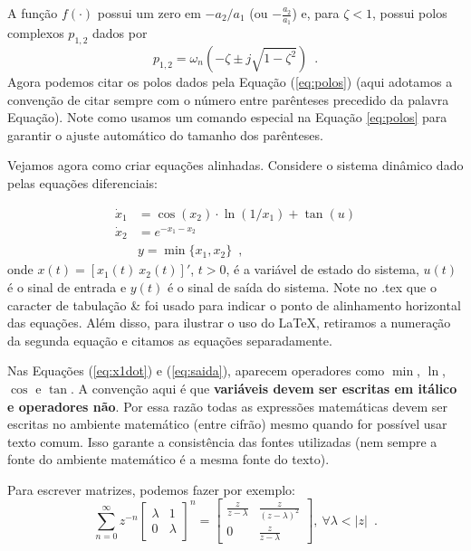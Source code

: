 A função $f(\cdot)$ possui um zero em $-a_2/a_1$ (ou $-\frac{a_2}{a_1}$) e, para $\zeta<1$, possui polos complexos $p_{1,2}$ dados por
\begin{equation}
\label{eq:polos}
p_{1,2}=\omega_n \left(-\zeta\pm j\sqrt{1-\zeta^2}\right)
\enspace.
\end{equation}
Agora podemos citar os polos dados pela Equação (\ref{eq:polos}) (aqui adotamos a convenção de citar sempre com o número entre parênteses precedido da palavra Equação). Note como usamos um comando especial na Equação \ref{eq:polos} para garantir o ajuste automático do tamanho dos parênteses.

Vejamos agora como criar equações alinhadas. Considere o sistema dinâmico dado pelas equações diferenciais:

\begin{align}
\dot{x}_1 & = \cos(x_2)\cdot\ln(1/x_1)+\tan(u) \label{eq:x1dot} \\
\dot{x}_2 & = e^{-x_1-x_2} \nonumber \\
& y  = \min\{x_1,x_2\}  \label{eq:saida}
\enspace,
\end{align}
onde $x(t)=[x_1(t) ~ x_2(t)]'$, $t>0$, é a variável de estado do sistema, $u(t)$ é o sinal de entrada e $y(t)$ é o sinal de saída do sistema. Note no .tex que o caracter de tabulação \textsf{\&} foi usado para indicar o ponto de alinhamento horizontal das equações. Além disso, para ilustrar o uso do \LaTeX, retiramos a numeração da segunda equação e citamos as equações separadamente.

Nas Equações (\ref{eq:x1dot}) e (\ref{eq:saida}), aparecem operadores como $\min$, $\ln$, $\cos$ e $\tan$. A convenção aqui é que \textbf{variáveis devem ser escritas em itálico e operadores não}. Por essa razão todas as expressões matemáticas devem ser escritas no ambiente matemático (entre cifrão) mesmo quando for possível usar texto comum. Isso garante a consistência das fontes utilizadas (nem sempre a fonte do ambiente matemático é a mesma fonte do texto). 

Para escrever matrizes, podemos fazer por exemplo:
\[
\sum_{n=0}^{\infty}z^{-n}\left[\begin{array}{cc}
\lambda & 1 \\
0 & \lambda
\end{array}\right]^n=
\left[\begin{array}{cc}
\frac{z}{z-\lambda} & \frac{z}{(z-\lambda)^2} \\
0 & \frac{z}{z-\lambda}
\end{array}\right]
,~\forall \lambda<|z|
\enspace.
\]

